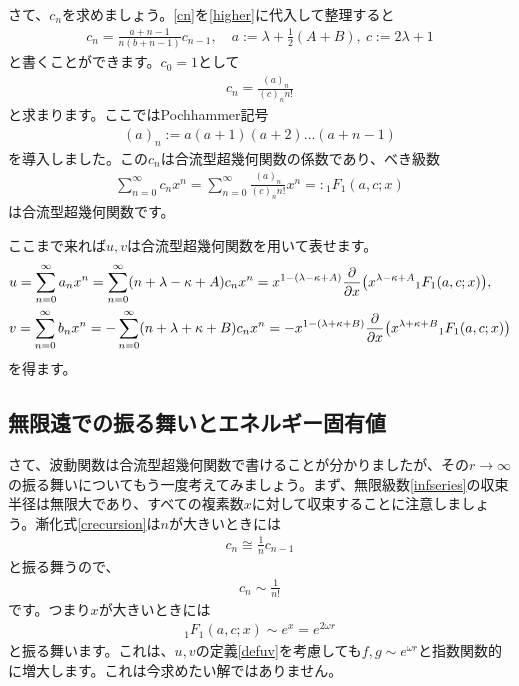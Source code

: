 \documentclass[report,paper=a4, fontsize=12pt, line_length=16cm, number_of_lines=33,dvipdfmx]{jlreq}
\numberwithin{equation}{chapter}
\newcommand{\Fii}{{}_1F_1}
\begin{document}
さて、$c_n$を求めましょう。\eqref{cn}を\eqref{higher}に代入して整理すると
\begin{align}
  c_n=\frac{a+n-1}{n(b+n-1)} c_{n-1},\quad a:=\lambda+\frac12(A+B),\ c:=2\lambda+1 \label{crecursion}
\end{align}
と書くことができます。$c_0=1$として
\begin{align}
  c_n=\frac{(a)_n}{(c)_n n!}
\end{align}
と求まります。ここではPochhammer記号
\begin{align}
  (a)_n:=a(a+1)(a+2)\dots(a+n-1)
\end{align}
を導入しました。この$c_n$は合流型超幾何関数の係数であり、べき級数
\begin{align}
  \sum_{n=0}^{\infty}c_nx^n=
  \sum_{n=0}^{\infty}\frac{(a)_n}{(c)_n n!}x^n=:\Fii(a,c;x)
  \label{infseries}
\end{align}
は合流型超幾何関数です。

ここまで来れば$u,v$は合流型超幾何関数を用いて表せます。
\begin{align}
  &u=\sum_{n=0}^{\infty}a_nx^n=
  \sum_{n=0}^{\infty}(n+\lambda-\kappa+A)c_nx^n=
  x^{1-(\lambda-\kappa+A)}\pdv{x} (x^{\lambda-\kappa+A}\Fii(a,c;x)),\\
  &v=\sum_{n=0}^{\infty}b_nx^n=
  -\sum_{n=0}^{\infty}(n+\lambda+\kappa+B)c_nx^n=
  -x^{1-(\lambda+\kappa+B)}\pdv{x} (x^{\lambda+\kappa+B}\Fii(a,c;x))
\end{align}
を得ます。

\subsection{無限遠での振る舞いとエネルギー固有値}
さて、波動関数は合流型超幾何関数で書けることが分かりましたが、その$r\to\infty$の振る舞いについてもう一度考えてみましょう。まず、無限級数\eqref{infseries}の収束半径は無限大であり、すべての複素数$x$に対して収束することに注意しましょう。漸化式\eqref{crecursion}は$n$が大きいときには
\begin{align}
  c_n\cong \frac{1}{n}c_{n-1}
\end{align}
と振る舞うので、
\begin{align}
  c_n\sim \frac{1}{n!}
\end{align}
です。つまり$x$が大きいときには
\begin{align}
  \Fii(a,c;x)\sim e^{x}=e^{2\omega r}
\end{align}
と振る舞います。これは、$u,v$の定義\eqref{defuv}を考慮しても$f,g\sim e^{\omega r}$と指数関数的に増大します。これは今求めたい解ではありません。
\end{document}

